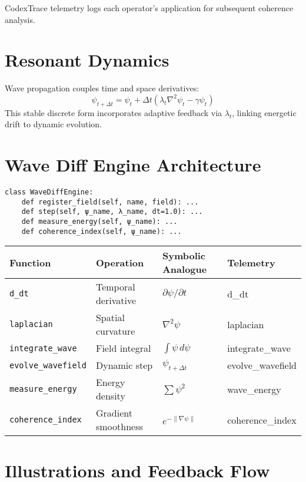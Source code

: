 \documentclass[11pt]{article}
\begin{document}
CodexTrace telemetry logs each operator’s application for subsequent coherence analysis.

\section{Resonant Dynamics}
Wave propagation couples time and space derivatives:
\[
\psi_{t+\Delta t}=\psi_t+\Delta t(\lambda_t\nabla^2\psi_t-\gamma\psi_t)
\]
This stable discrete form incorporates adaptive feedback via $\lambda_t$, linking energetic drift to dynamic evolution.

\section{Wave Diff Engine Architecture}
\begin{verbatim}
class WaveDiffEngine:
    def register_field(self, name, field): ...
    def step(self, ψ_name, λ_name, dt=1.0): ...
    def measure_energy(self, ψ_name): ...
    def coherence_index(self, ψ_name): ...
\end{verbatim}

\begin{center}
\renewcommand{\arraystretch}{1.3}
\begin{tabular}{llll}
\toprule
\textbf{Function} & \textbf{Operation} & \textbf{Symbolic Analogue} & \textbf{Telemetry}\\
\midrule
\texttt{d\_dt} & Temporal derivative & $\partial\psi/\partial t$ & d\_dt\\
\texttt{laplacian} & Spatial curvature & $\nabla^2\psi$ & laplacian\\
\texttt{integrate\_wave} & Field integral & $\int\psi\,d\psi$ & integrate\_wave\\
\texttt{evolve\_wavefield} & Dynamic step & $\psi_{t+\Delta t}$ & evolve\_wavefield\\
\texttt{measure\_energy} & Energy density & $\sum\psi^2$ & wave\_energy\\
\texttt{coherence\_index} & Gradient smoothness & $e^{-\lVert\nabla\psi\rVert}$ & coherence\_index\\
\bottomrule
\end{tabular}
\end{center}

\section{Illustrations and Feedback Flow}
\end{document}
